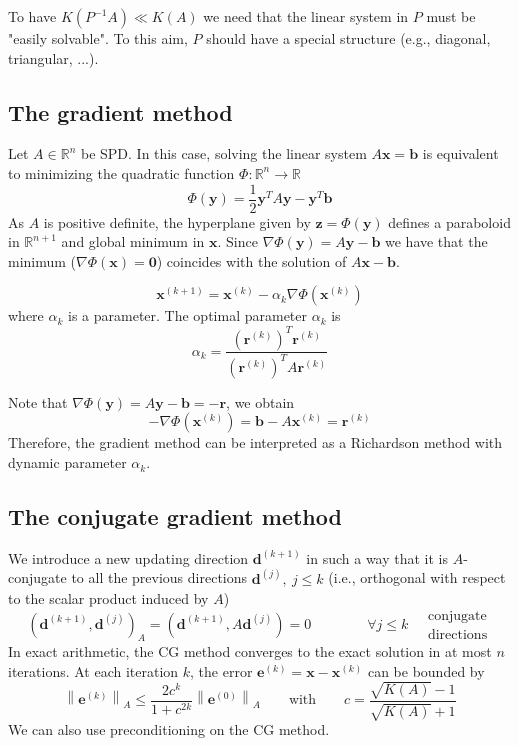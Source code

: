 To have $K(P^{-1}A) \ll K(A)$ we need that the linear system in $P$ must be "easily solvable". To this aim, $P$ should have a special structure (e.g., diagonal, triangular, ...).

\subsection{The gradient method}

Let $A \in \mathbb{R}^{n}$ be SPD. In this case, solving the linear system $A \mathbf{x} = \mathbf{b}$ is equivalent to minimizing the quadratic function $\Phi : \mathbb{R}^{n} \to \mathbb{R}$
$$
    \Phi(\mathbf{y}) = \frac{1}{2} \mathbf{y}^{T} A \mathbf{y} - \mathbf{y}^{T}\mathbf{b}
$$
As $A$ is positive definite, the hyperplane given by $\mathbf{z} = \Phi(\mathbf{y})$ defines a paraboloid in $\mathbb{R}^{n+1}$ and global minimum in $\mathbf{x}$. Since $\nabla \Phi(\mathbf{y}) = A\mathbf{y} - \mathbf{b}$ we have that the minimum ($\nabla \Phi(\mathbf{x}) = \mathbf{0}$) coincides with the solution of $A \mathbf{x} - \mathbf{b}$.

$$
    \mathbf{x}^{(k+1)} = \mathbf{x}^{(k)} - \alpha_{k} \nabla \Phi(\mathbf{x}^{(k)})
$$
where $\alpha_{k}$ is a parameter. The optimal parameter $\alpha_{k}$ is
$$
    \alpha_{k} = \frac{\left( \mathbf{r}^{(k)} \right)^{T} \mathbf{r}^{(k)}}{\left( \mathbf{r}^{(k)} \right)^{T} A \mathbf{r}^{(k)}}
$$

Note that $\nabla \Phi(\mathbf{y}) = A \mathbf{y} - \mathbf{b} = - \mathbf{r}$, we obtain
$$
    -\nabla\Phi(\mathbf{x}^{(k)}) = \mathbf{b} - A \mathbf{x}^{(k)} = \mathbf{r}^{(k)}
$$
Therefore, the gradient method can be interpreted as a Richardson method with dynamic parameter $\alpha_{k}$.

\subsection{The conjugate gradient method}

We introduce a new updating direction $\mathbf{d}^{(k+1)}$ in such a way that it is $A$-conjugate to all the previous directions $\mathbf{d}^{(j)}, \ j \leq k$ (i.e., orthogonal with respect to the scalar product induced by $A$)
$$
    \left( \mathbf{d}^{(k+1)}, \mathbf{d}^{(j)} \right)_{A} = \left( \mathbf{d}^{(k+1)}, A \mathbf{d}^{(j)} \right) = 0 \qquad \qquad \forall j \leq k \quad \begin{matrix}
        \text{conjugate} \\ \text{directions}
    \end{matrix}
$$
In exact arithmetic, the CG method converges to the exact solution in at most $n$ iterations. At each iteration $k$, the error $\mathbf{e}^{(k)} = \mathbf{x} - \mathbf{x}^{(k)}$ can be bounded by
$$
    \left\lVert \mathbf{e}^{(k)} \right\rVert _{A} \leq \frac{2c^{k}}{1 + c^{2k}} \left\lVert \mathbf{e}^{(0)} \right\rVert _{A} \qquad \text{with} \qquad c = \frac{\sqrt{ K(A) } - 1}{\sqrt{ K(A) } + 1}
$$
We can also use preconditioning on the CG method.

